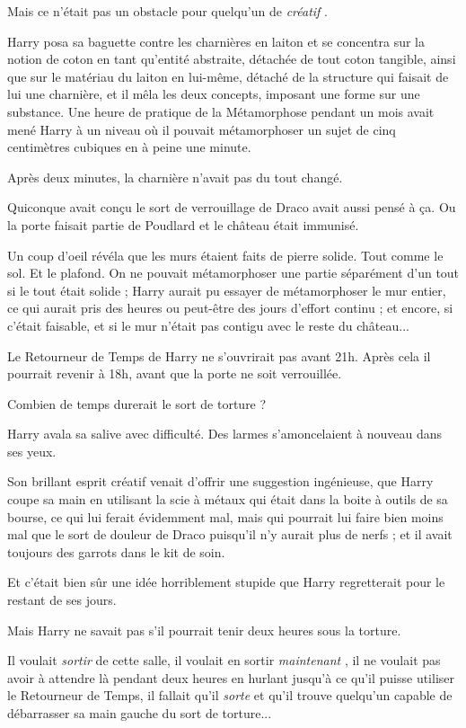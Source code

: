 Mais ce n'était pas un obstacle pour quelqu'un de \emph{créatif} .

Harry posa sa baguette contre les charnières en laiton et se concentra sur la notion de coton en tant qu'entité abstraite, détachée de tout coton tangible, ainsi que sur le matériau du laiton en lui-même, détaché de la structure qui faisait de lui une charnière, et il mêla les deux concepts, imposant une forme sur une substance. Une heure de pratique de la Métamorphose pendant un mois avait mené Harry à un niveau où il pouvait métamorphoser un sujet de cinq centimètres cubiques en à peine une minute.

Après deux minutes, la charnière n'avait pas du tout changé.

Quiconque avait conçu le sort de verrouillage de Draco avait aussi pensé à ça. Ou la porte faisait partie de Poudlard et le château était immunisé.

Un coup d'oeil révéla que les murs étaient faits de pierre solide. Tout comme le sol. Et le plafond. On ne pouvait métamorphoser une partie séparément d'un tout si le tout était solide ; Harry aurait pu essayer de métamorphoser le mur entier, ce qui aurait pris des heures ou peut-être des jours d'effort continu ; et encore, si c'était faisable, et si le mur n'était pas contigu avec le reste du château...

Le Retourneur de Temps de Harry ne s'ouvrirait pas avant 21h. Après cela il pourrait revenir à 18h, avant que la porte ne soit verrouillée.

Combien de temps durerait le sort de torture ?

Harry avala sa salive avec difficulté. Des larmes s'amoncelaient à nouveau dans ses yeux.

Son brillant esprit créatif venait d'offrir une suggestion ingénieuse, que Harry coupe sa main en utilisant la scie à métaux qui était dans la boite à outils de sa bourse, ce qui lui ferait évidemment mal, mais qui pourrait lui faire bien moins mal que le sort de douleur de Draco puisqu'il n'y aurait plus de nerfs ; et il avait toujours des garrots dans le kit de soin.

Et c'était bien sûr une idée horriblement stupide que Harry regretterait pour le restant de ses jours.

Mais Harry ne savait pas s'il pourrait tenir deux heures sous la torture.

Il voulait \emph{sortir}  de cette salle, il voulait en sortir \emph{maintenant} , il ne voulait pas avoir à attendre là pendant deux heures en hurlant jusqu'à ce qu'il puisse utiliser le Retourneur de Temps, il fallait qu'il \emph{sorte}  et qu'il trouve quelqu'un capable de débarrasser sa main gauche du sort de torture...


